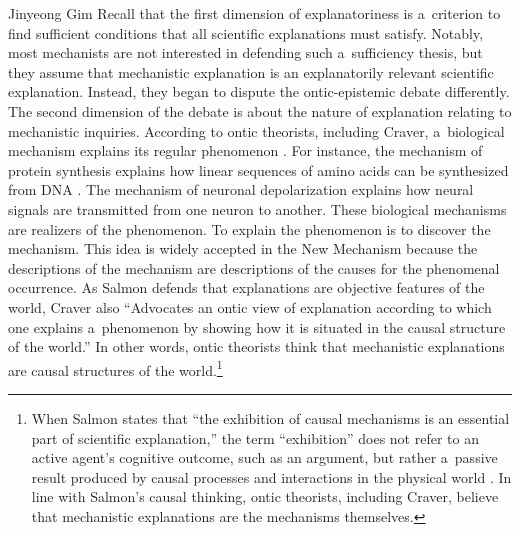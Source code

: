 \begin{artengenv}{Jinyeong Gim}
Recall that the first dimension of explanatoriness is a~criterion to find sufficient conditions that all scientific explanations must satisfy. Notably, most mechanists are not interested in defending such a~sufficiency thesis, but they assume that mechanistic explanation is an explanatorily relevant scientific explanation. Instead, they began to dispute the ontic-epistemic debate differently. The second dimension of the debate is about the nature of explanation relating to mechanistic inquiries. According to ontic theorists, including Craver, a~biological mechanism explains its regular phenomenon
\parencites[][]{machamer_thinking_2000}[][]{craver_explaining_2007}[][]{craver_search_2013}. %
 For instance, the mechanism of protein synthesis explains how linear sequences of amino acids can be synthesized from DNA 
\parencite[see][]{darden_reasoning_2006}. %
 The mechanism of neuronal depolarization explains how neural signals are transmitted from one neuron to another. These biological mechanisms are realizers of the phenomenon. To explain the phenomenon is to discover the mechanism. This idea is widely accepted in the New Mechanism because the descriptions of the mechanism are descriptions of the causes for the phenomenal occurrence. As Salmon defends that explanations are objective features of the world, Craver 
\parencite*[][p.200]{craver_explaining_2007} %
 also ``Advocates an ontic view of explanation according to which one explains a~phenomenon by showing how it is situated in the causal structure of the world.'' In other words, ontic theorists think that mechanistic explanations are causal structures of the world.\footnote{When Salmon 
\parencite*[][p.127]{salmon_scientific_1984} %
 states that ``the exhibition of causal mechanisms is an essential part of scientific explanation,'' the term ``exhibition'' does not refer to an active agent's cognitive outcome, such as an argument, but rather a~passive result produced by causal processes and interactions in the physical world 
\parencite[see][p.132]{salmon_scientific_1984}. %
 In line with Salmon's causal thinking, ontic theorists, including Craver, believe that mechanistic explanations are the mechanisms themselves.}


\end{artengenv}
